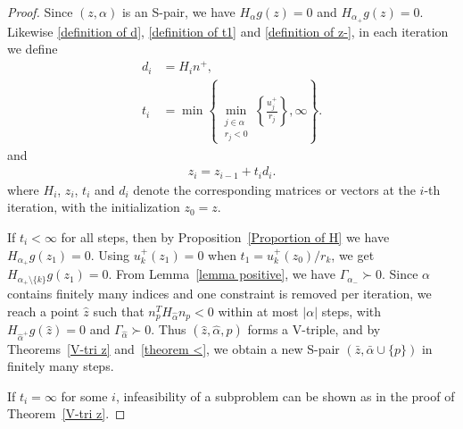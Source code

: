 \documentclass{article}
\begin{document}
	\begin{proof}
		Since $(z, \alpha)$ is an S-pair, we have $H_{\alpha}g(z) = 0$ and $H_{\alpha_{+}}g(z) = 0$. 
		Likewise \eqref{definition of d}, \eqref{definition of t1} and \eqref{definition of z-}, in each iteration we define
		\begin{align*}
			d_{i} & = H_{i}n^{+},\\
			t_{i} & = \min\left\lbrace\min_{\substack{j \in\alpha\\
					r_{j}<0}}\left\lbrace \frac{u_{j}^{+}}{r_{j}}\right\rbrace, \infty\right\rbrace.
		\end{align*}
		and
		\begin{align*}
			z_{i} = z_{i - 1} + t_{i}d_{i}.
		\end{align*}
		where $H_{i}$, $z_{i}$, $t_{i}$ and $d_{i}$ denote the corresponding matrices or vectors at the $i$-th iteration, with the initialization $z_{0} = z$.
		
		If $t_{i} < \infty$ for all steps, then by Proposition~\ref{Proportion of H} we have $H_{\alpha_{+}}g(z_{1}) = 0$. 
		Using $u_{k}^{+}(z_{1}) = 0$ when $t_{1} = u_{k}^{+}(z_{0})/r_{k}$, we get $H_{\alpha_{+}\setminus\{k\}}g(z_{1}) = 0$. 
		From Lemma~\ref{lemma positive}, we have $\Gamma_{\alpha_{-}} \succ 0$. Since $\alpha$ contains finitely many indices and one constraint is removed per iteration, we reach a point $\hat{z}$ such that $n_{p}^{T}H_{\hat{\alpha}}n_{p} < 0$ within at most $|\alpha|$ steps, with $H_{\hat{\alpha}^{+}}g(\hat{z}) = 0$ and $\Gamma_{\hat{\alpha}} \succ 0$. 
		Thus $(\hat{z}, \hat{\alpha}, p)$ forms a V-triple, and by Theorems~\ref{V-tri z} and~\ref{theorem <}, we obtain a new S-pair $(\bar{z}, \bar{\alpha}\cup\{p\})$ in finitely many steps.
		
		If $t_{i} = \infty$ for some $i$, infeasibility of a subproblem can be shown as in the proof of Theorem~\ref{V-tri z}.
		

\end{proof}
\end{document}
